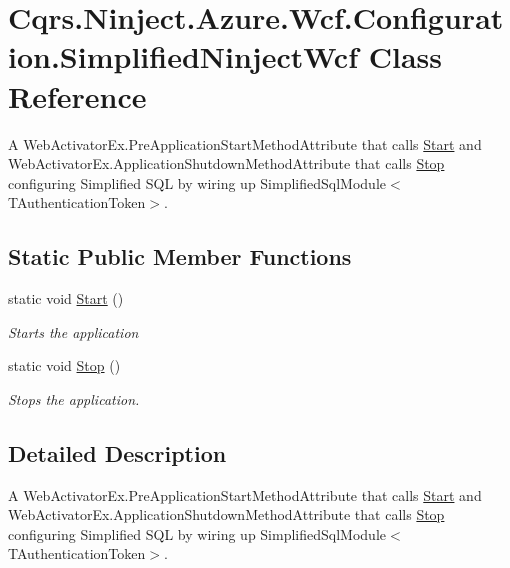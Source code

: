 \hypertarget{classCqrs_1_1Ninject_1_1Azure_1_1Wcf_1_1Configuration_1_1SimplifiedNinjectWcf}{}\section{Cqrs.\+Ninject.\+Azure.\+Wcf.\+Configuration.\+Simplified\+Ninject\+Wcf Class Reference}
\label{classCqrs_1_1Ninject_1_1Azure_1_1Wcf_1_1Configuration_1_1SimplifiedNinjectWcf}


A Web\+Activator\+Ex.\+Pre\+Application\+Start\+Method\+Attribute that calls \hyperlink{classCqrs_1_1Ninject_1_1Azure_1_1Wcf_1_1Configuration_1_1SimplifiedNinjectWcf_a4686133f581e5e5d890ec78faa26584e_a4686133f581e5e5d890ec78faa26584e}{Start} and Web\+Activator\+Ex.\+Application\+Shutdown\+Method\+Attribute that calls \hyperlink{classCqrs_1_1Ninject_1_1Azure_1_1Wcf_1_1Configuration_1_1SimplifiedNinjectWcf_a7a4bdce5525a0b3ae46efacedb74bbda_a7a4bdce5525a0b3ae46efacedb74bbda}{Stop} configuring Simplified S\+QL by wiring up Simplified\+Sql\+Module$<$\+T\+Authentication\+Token$>$.  


\subsection*{Static Public Member Functions}
\begin{DoxyCompactItemize}
\item 
static void \hyperlink{classCqrs_1_1Ninject_1_1Azure_1_1Wcf_1_1Configuration_1_1SimplifiedNinjectWcf_a4686133f581e5e5d890ec78faa26584e_a4686133f581e5e5d890ec78faa26584e}{Start} ()
\begin{DoxyCompactList}\small\item\em Starts the application \end{DoxyCompactList}\item 
static void \hyperlink{classCqrs_1_1Ninject_1_1Azure_1_1Wcf_1_1Configuration_1_1SimplifiedNinjectWcf_a7a4bdce5525a0b3ae46efacedb74bbda_a7a4bdce5525a0b3ae46efacedb74bbda}{Stop} ()
\begin{DoxyCompactList}\small\item\em Stops the application. \end{DoxyCompactList}\end{DoxyCompactItemize}


\subsection{Detailed Description}
A Web\+Activator\+Ex.\+Pre\+Application\+Start\+Method\+Attribute that calls \hyperlink{classCqrs_1_1Ninject_1_1Azure_1_1Wcf_1_1Configuration_1_1SimplifiedNinjectWcf_a4686133f581e5e5d890ec78faa26584e_a4686133f581e5e5d890ec78faa26584e}{Start} and Web\+Activator\+Ex.\+Application\+Shutdown\+Method\+Attribute that calls \hyperlink{classCqrs_1_1Ninject_1_1Azure_1_1Wcf_1_1Configuration_1_1SimplifiedNinjectWcf_a7a4bdce5525a0b3ae46efacedb74bbda_a7a4bdce5525a0b3ae46efacedb74bbda}{Stop} configuring Simplified S\+QL by wiring up Simplified\+Sql\+Module$<$\+T\+Authentication\+Token$>$. 



